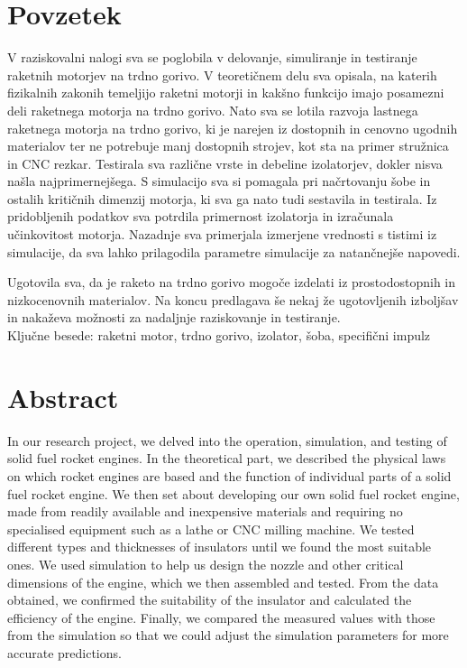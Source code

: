 \documentclass[titlepage, a4paper, twoside, final, 12pt]{article}
\begin{document}
		\section*{Povzetek}
		V raziskovalni nalogi sva se poglobila v delovanje, simuliranje in testiranje raketnih motorjev na trdno gorivo. V teoretičnem delu sva opisala, na katerih fizikalnih zakonih temeljijo raketni motorji in kakšno funkcijo imajo posamezni deli raketnega motorja na trdno gorivo. Nato sva se lotila razvoja lastnega raketnega motorja na trdno gorivo, ki je narejen iz dostopnih in cenovno ugodnih materialov ter ne potrebuje manj dostopnih strojev, kot sta na primer stružnica in CNC rezkar. Testirala sva različne vrste in debeline izolatorjev, dokler nisva našla najprimernejšega. S simulacijo sva si pomagala pri načrtovanju šobe in ostalih kritičnih dimenzij motorja, ki sva ga nato tudi sestavila in testirala. Iz pridobljenih podatkov sva potrdila primernost izolatorja in izračunala učinkovitost motorja. Nazadnje sva primerjala izmerjene vrednosti s tistimi iz simulacije, da sva lahko prilagodila parametre simulacije za natančnejše napovedi.

		Ugotovila sva, da je raketo na trdno gorivo mogoče izdelati iz prostodostopnih in nizkocenovnih materialov. Na koncu predlagava še nekaj že ugotovljenih izboljšav in nakaževa možnosti za nadaljnje raziskovanje in testiranje.
		\\[2ex]
		Ključne besede: raketni motor, trdno gorivo, izolator, šoba, specifični impulz

\vspace{0.5cm}
\section*{Abstract}
		In our research project, we delved into the operation, simulation, and testing of solid fuel rocket engines. In the theoretical part, we described the physical laws on which rocket engines are based and the function of individual parts of a solid fuel rocket engine. We then set about developing our own solid fuel rocket engine, made from readily available and inexpensive materials and requiring no specialised equipment such as a lathe or CNC milling machine. We tested different types and thicknesses of insulators until we found the most suitable ones. We used simulation to help us design the nozzle and other critical dimensions of the engine, which we then assembled and tested. From the data obtained, we confirmed the suitability of the insulator and calculated the efficiency of the engine. Finally, we compared the measured values with those from the simulation so that we could adjust the simulation parameters for more accurate predictions.
\end{document}
